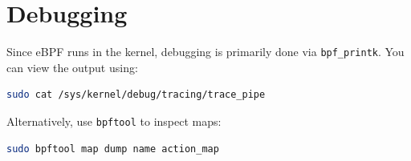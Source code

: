 \documentclass[11pt,a4paper]{report}
\begin{document}
\chapter{Debugging}

Since eBPF runs in the kernel, debugging is primarily done via \texttt{bpf\_printk}. You can view the output using:

\begin{lstlisting}[language=bash]
sudo cat /sys/kernel/debug/tracing/trace_pipe
\end{lstlisting}

Alternatively, use \texttt{bpftool} to inspect maps:

\begin{lstlisting}[language=bash]
sudo bpftool map dump name action_map
\end{lstlisting}
\end{document}
